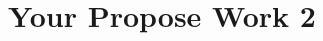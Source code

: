 \fancyhead[RE]{\fontsize{8}{12}\selectfont\leftmark}
\chapter{Your Propose Work 2}
\label{pwork2}







